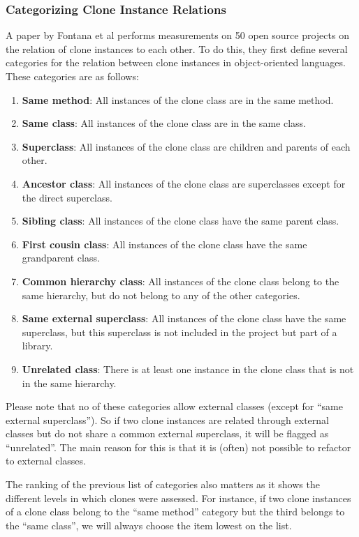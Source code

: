 \documentclass[a4paper]{article}
\begin{document}
\subsubsection{Categorizing Clone Instance Relations}
A paper by Fontana et al \cite{fontana2015duplicated} performs measurements on 50 open source projects on the relation of clone instances to each other. To do this, they first define several categories for the relation between clone instances in object-oriented languages. These categories are as follows:
\begin{enumerate}
  \item \textbf{Same method}: All instances of the clone class are in the same method.
  \item \textbf{Same class}: All instances of the clone class are in the same class.
  \item \textbf{Superclass}: All instances of the clone class are children and parents of each other.
  \item \textbf{Ancestor class}: All instances of the clone class are superclasses except for the direct superclass.
  \item \textbf{Sibling class}: All instances of the clone class have the same parent class.
  \item \textbf{First cousin class}: All instances of the clone class have the same grandparent class.
\item \textbf{Common hierarchy class}: All instances of the clone class belong to the same hierarchy, but do not belong to any of the other categories.
\item \textbf{Same external superclass}: All instances of the clone class have the same superclass, but this superclass is not included in the project but part of a library.
\item \textbf{Unrelated class}: There is at least one instance in the clone class that is not in the same hierarchy.
\end{enumerate}
Please note that no of these categories allow external classes (except for ``same external superclass''). So if two clone instances are related through external classes but do not share a common external superclass, it will be flagged as ``unrelated''. The main reason for this is that it is (often) not possible to refactor to external classes.

The ranking of the previous list of categories also matters as it shows the different levels in which clones were assessed. For instance, if two clone instances of a clone class belong to the ``same method'' category but the third belongs to the ``same class'', we will always choose the item lowest on the list.
\end{document}
